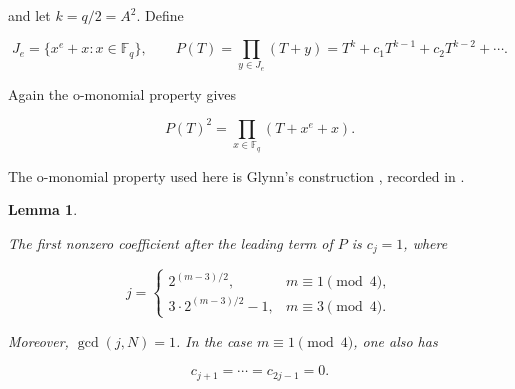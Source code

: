 \documentclass[11pt]{article}
\newtheorem{lemma}[theorem]{Lemma}
\begin{document}
and let \(k=q/2=A^2\). Define

\[
J_e=\{x^e+x:x\in\mathbb F_q\},\qquad
P(T)=\prod_{y\in J_e}(T+y)
=T^k+c_1T^{k-1}+c_2T^{k-2}+\cdots.
\]

Again the o-monomial property gives

\[
P(T)^2=\prod_{x\in\mathbb F_q}(T+x^e+x).
\tag{4.1}
\]

The o-monomial property used here is Glynn's construction \cite{glynn}, recorded in
\cite[Theorem~13]{ding-tang}.

\Needspace{0.18\textheight}
\begin{lemma}
\label{lem:glynn-coefficient}

The first nonzero coefficient after the leading term of \(P\) is \(c_j=1\),
where

\[
j=
\begin{cases}
2^{(m-3)/2},&m\equiv1\pmod4,\\[4pt]
3\cdot2^{(m-3)/2}-1,&m\equiv3\pmod4.
\end{cases}
\tag{4.2}
\]

Moreover, \(\gcd(j,N)=1\). In the case \(m\equiv1\pmod4\), one also has

\[
c_{j+1}=\cdots=c_{2j-1}=0.
\tag{4.3}
\]

\end{lemma}
\end{document}
